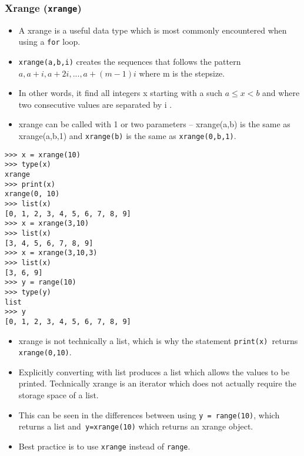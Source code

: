 \documentclass[KSmain.tex]{subfiles}
\begin{document}
\subsubsection{Xrange (\texttt{xrange})}
\begin{itemize}
\item A xrange is a useful data type which is most commonly encountered when using a \texttt{for} loop. 
\item 
\texttt{xrange(a,b,i)}
creates the sequences that follows the pattern $a, a +i , a +2i , . . . , a +(m -1)i$ where m is the stepsize.
\item In other
words, it find all integers x starting with a such $a \leq x < b$ and where two consecutive values are separated
by i . \item 
xrange can be called with 1 or two parameters – xrange(a,b) is the same as xrange(a,b,1)
and \texttt{xrange(b)} is the same as \texttt{xrange(0,b,1)}.
\end{itemize}
\begin{framed}
\begin{verbatim}
>>> x = xrange(10)
>>> type(x)
xrange
>>> print(x)
xrange(0, 10)
>>> list(x)
[0, 1, 2, 3, 4, 5, 6, 7, 8, 9]
>>> x = xrange(3,10)
>>> list(x)
[3, 4, 5, 6, 7, 8, 9]
>>> x = xrange(3,10,3)
>>> list(x)
[3, 6, 9]
>>> y = range(10)
>>> type(y)
list
>>> y
[0, 1, 2, 3, 4, 5, 6, 7, 8, 9]
\end{verbatim}
\end{framed}
\begin{itemize}
\item xrange is not technically a list, which is why the statement \texttt{print(x) }returns \texttt{xrange(0,10)}. 
\item Explicitly
converting with list produces a list which allows the values to be printed. Technically xrange is an iterator
which does not actually require the storage space of a list. 
\item This can be seen in the differences between
using \texttt{y = range(10)}, which returns a list and\texttt{ y=xrange(10)} which returns an xrange object. 
\item Best practice
is to use \texttt{xrange} instead of \texttt{range}.
\end{itemize}
\end{document}
